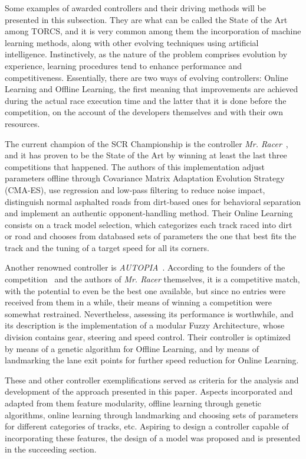 	Some examples of awarded controllers and their driving methods will be presented in this subsection. They are
	what can be called the State of the Art among TORCS, and it is very common among them the incorporation of
	machine learning methods, along with other evolving techniques using artificial intelligence. Instinctively, as
	the nature of the problem comprises evolution by experience, learning procedures tend to enhance performance and
	competitiveness. Essentially, there are two ways of evolving controllers: Online Learning and Offline Learning,
	the first meaning that improvements are achieved during the actual race execution time and the latter that it is
	done before the competition, on the account of the developers themselves and with their own resources.
	
	The current champion of the SCR Championship is the controller \emph{Mr. Racer}~\cite{MrRacer}, and it has
	proven to be the State of the Art by winning at least the last three competitions that happened. The authors
	of this implementation adjust parameters offline through Covariance Matrix Adaptation Evolution Strategy
	(CMA-ES), use regression and low-pass filtering to reduce noise impact, distinguish normal asphalted roads
	from dirt-based ones for behavioral separation and implement an authentic opponent-handling method. Their
	Online Learning consists on a track model selection, which categorizes each track raced into dirt or road and
	chooses from databased sets of parameters the one that best fits the track and the tuning of a target speed for
	all its	corners.
	
	Another renowned controller is \emph{AUTOPIA}~\cite{AUTOPIA}. According to the founders of the
	competition~\cite{SCRC} and the authors of \emph{Mr. Racer} themselves, it is a competitive match, with the
	potential to even be the best one available, but since no entries were received from them in a while, their
	means of winning a competition were somewhat restrained. Nevertheless, assessing its performance is
	worthwhile, and its description is the implementation of a modular Fuzzy Architecture, whose division contains
	gear, steering and speed control. Their controller is optimized by means of a genetic algorithm for Offline
	Learning, and by means of landmarking the lane exit points for further speed reduction for Online Learning.
	
	These and other controller exemplifications served as criteria for the analysis and development of the
	approach presented in this paper. Aspects incorporated and adapted from them feature modularity, offline learning
	through genetic algorithms, online learning through landmarking and choosing sets of parameters for different
	categories of tracks, etc. Aspiring to design a controller capable of incorporating these features, the design of
	a model was proposed and is presented in the succeeding section.
	